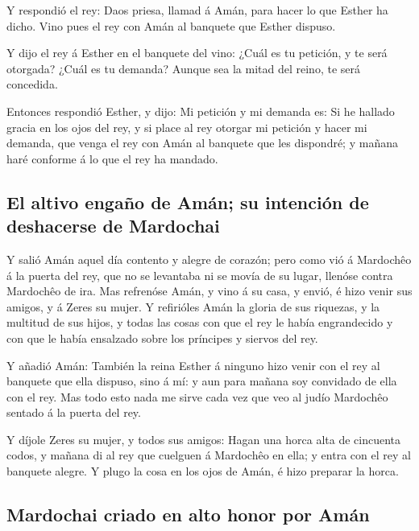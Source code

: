  Y respondió el rey: Daos priesa, llamad á Amán, para hacer
lo que Esther ha dicho. Vino pues el rey con Amán al banquete que Esther
dispuso.

 Y dijo el rey á Esther en el banquete del vino: ¿Cuál es tu
petición, y te será otorgada? ¿Cuál es tu demanda? Aunque sea la mitad
del reino, te será concedida.

 Entonces respondió Esther, y dijo: Mi petición y mi demanda
es:  Si he hallado gracia en los ojos del rey, y si place al
rey otorgar mi petición y hacer mi demanda, que venga el rey con Amán al
banquete que les dispondré; y mañana haré conforme á lo que el rey ha
mandado.

\hypertarget{el-altivo-engauxf1o-de-amuxe1n-su-intenciuxf3n-de-deshacerse-de-mardochai}{%
\subsection{El altivo engaño de Amán; su intención de deshacerse de
Mardochai}\label{el-altivo-engauxf1o-de-amuxe1n-su-intenciuxf3n-de-deshacerse-de-mardochai}}

 Y salió Amán aquel día contento y alegre de corazón; pero
como vió á Mardochêo á la puerta del rey, que no se levantaba ni se
movía de su lugar, llenóse contra Mardochêo de ira.  Mas
refrenóse Amán, y vino á su casa, y envió, é hizo venir sus amigos, y á
Zeres su mujer.  Y refirióles Amán la gloria de sus
riquezas, y la multitud de sus hijos, y todas las cosas con que el rey
le había engrandecido y con que le había ensalzado sobre los príncipes y
siervos del rey.

 Y añadió Amán: También la reina Esther á ninguno hizo
venir con el rey al banquete que ella dispuso, sino á mí: y aun para
mañana soy convidado de ella con el rey.  Mas todo esto
nada me sirve cada vez que veo al judío Mardochêo sentado á la puerta
del rey.

 Y díjole Zeres su mujer, y todos sus amigos: Hagan una
horca alta de cincuenta codos, y mañana di al rey que cuelguen á
Mardochêo en ella; y entra con el rey al banquete alegre. Y plugo la
cosa en los ojos de Amán, é hizo preparar la horca.

\hypertarget{mardochai-criado-en-alto-honor-por-amuxe1n}{%
\subsection{Mardochai criado en alto honor por
Amán}\label{mardochai-criado-en-alto-honor-por-amuxe1n}}

